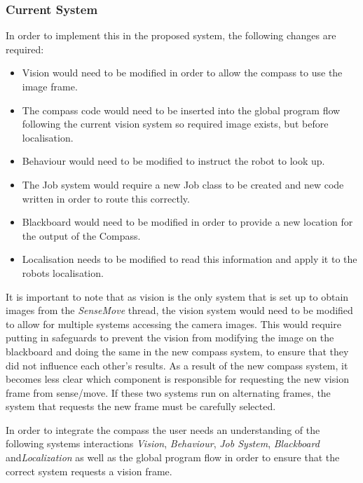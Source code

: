 \documentclass[english,12pt]{scrartcl}
\begin{document}
			\subsubsection{Current System}
				In order to implement this in the proposed system, the following changes are required:
				
				\begin{itemize}
					\item Vision would need to be modified in order to allow the compass to use the image frame.
					\item The compass code would need to be inserted into the global program flow following the current vision system so required image exists, but before localisation.
					\item Behaviour would need to be modified to instruct the robot to look up.
					\item The Job system would require a new Job class to be created and new code written in order to route this correctly.
					\item Blackboard would need to be modified in order to provide a new location for the output of the Compass.
					\item Localisation needs to be modified to read this information and apply it to the robots localisation.
				\end{itemize}
			
				It is important to note that as vision is the only system that is set up to obtain images from the \emph{SenseMove} thread, the vision system would need to be modified to allow for multiple systems accessing the camera images.
				This would require putting in safeguards to prevent the vision from modifying the image on the blackboard and doing the same in the new compass system, to ensure that they did not influence each other’s results.
				As a result of the new compass system, it becomes less clear which component is responsible for requesting the new vision frame from sense/move.
				If these two systems run on alternating frames, the system that requests the new frame must be carefully selected.
				
				In order to integrate the compass the user needs an understanding of the following systems interactions \emph{Vision}, \emph{Behaviour}, \emph{Job System}, \emph{Blackboard} and\emph{Localization} as well as the global program flow in order to ensure that the correct system requests a vision frame.
				
\end{document}
